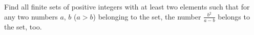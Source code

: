 Find all finite sets of positive integers with at least two elements such that for any two numbers $ a$,  $ b$ ($ a > b$) belonging to the set, the number $ \frac {b^2}{a - b}$ belongs to the set, too.